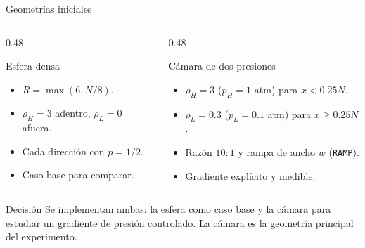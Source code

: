 \documentclass[aspectratio=169]{beamer}
\begin{document}
\begin{frame}{Geometrías iniciales}
  \begin{columns}[T]
    \begin{column}{0.48\textwidth}
      \begin{block}{Esfera densa}
        \footnotesize
        \begin{itemize}
          \item $R=\max(6,N/8)$.
          \item $\rho_H=3$ adentro, $\rho_L=0$ afuera.
          \item Cada dirección con $p=1/2$.
          \item Caso base para comparar.
        \end{itemize}
      \end{block}
    \end{column}
    \begin{column}{0.48\textwidth}
      \begin{block}{Cámara de dos presiones}
        \footnotesize
        \begin{itemize}
          \item $\rho_H=3$ ($p_H=1$ atm) para $x<0.25N$.
          \item $\rho_L=0.3$ ($p_L=0.1$ atm) para $x\ge 0.25N$.
          \item Razón $10{:}1$ y rampa de ancho $w$ (\texttt{RAMP}).
          \item Gradiente explícito y medible.
        \end{itemize}
      \end{block}
    \end{column}
  \end{columns}
  \vspace{4mm}
  \begin{block}{Decisión}
    \footnotesize
    Se implementan \alert{ambas}: la esfera como caso base y la cámara para
    estudiar un gradiente de presión controlado. La cámara es la geometría
    principal del experimento.
  \end{block}
\end{frame}
\end{document}
